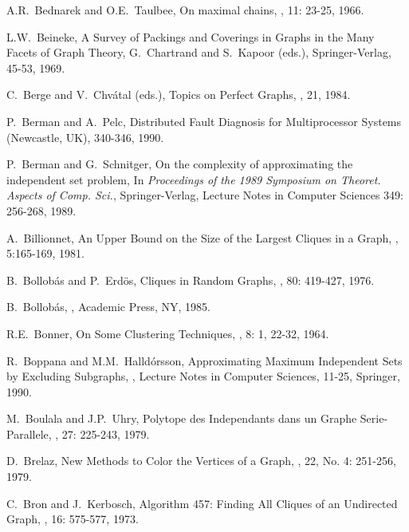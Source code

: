 \begin{thebibliography}{10}
A.R.~Bednarek and O.E.~Taulbee,
\newblock On maximal chains,
, 11: 23-25, 1966.

L.W.~Beineke,
\newblock A Survey of Packings and Coverings in Graphs in the Many
Facets of Graph Theory,
\newblock G.~Chartrand and S.~Kapoor (eds.), Springer-Verlag, 45-53,
1969.

C.~Berge and V.~Chv\'{a}tal (eds.),
\newblock Topics on Perfect Graphs,
, 21, 1984.

P.~Berman and A.~Pelc,
\newblock Distributed Fault Diagnosis for Multiprocessor Systems
 (Newcastle, UK), 340-346, 1990.

P.~Berman and G.~Schnitger,
\newblock On the complexity of approximating the independent set
problem,
\newblock In {\em Proceedings of the 1989 Symposium on Theoret.
Aspects of Comp. Sci.}, Springer-Verlag, Lecture Notes in Computer
Sciences 349: 256-268, 1989.

A.~Billionnet,
\newblock An Upper Bound on the Size of the Largest Cliques in a
Graph,
, 5:165-169, 1981.

B.~Bollob\'{a}s and P.~Erd\"{o}s,
\newblock Cliques in Random Graphs,
, 80: 419-427,
1976.

B.~Bollob\'{a}s,
,
\newblock Academic Press, NY, 1985.

R.E.~Bonner,
\newblock On Some Clustering Techniques,
, 8: 1, 22-32, 1964.

R.~Boppana and M.M.~Halld\'{o}rsson,
\newblock Approximating Maximum Independent Sets by Excluding
Subgraphs,
, Lecture Notes in Computer Sciences,
11-25, Springer, 1990.

M.~Boulala and J.P.~Uhry,
\newblock Polytope des Independants dans un Graphe Serie-Parallele,
, 27: 225-243, 1979.

D.~Brelaz,
\newblock New Methods to Color the Vertices of a Graph,
, 22, No. 4: 251-256, 1979.


C.~Bron and J.~Kerbosch,
\newblock Algorithm 457: Finding All Cliques of an Undirected
Graph,
, 16: 575-577, 1973.


\end{thebibliography}
